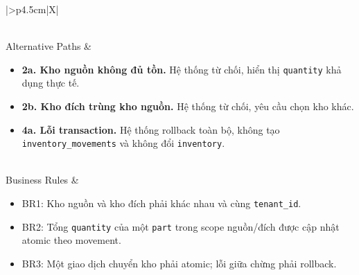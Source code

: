 \begin{xltabular}{\textwidth}{|>{\bfseries}p{4.5cm}|X|}
\begin{enumerate}[leftmargin=*, nosep]
    \end{enumerate} \\
    \hline
    Alternative Paths &
    \begin{itemize}[leftmargin=*, nosep]
        \item \textbf{2a. Kho nguồn không đủ tồn.} Hệ thống từ chối, hiển thị \texttt{quantity} khả dụng thực tế.
        \item \textbf{2b. Kho đích trùng kho nguồn.} Hệ thống từ chối, yêu cầu chọn kho khác.
        \item \textbf{4a. Lỗi transaction.} Hệ thống rollback toàn bộ, không tạo \texttt{inventory\_movements} và không đổi \texttt{inventory}.
    \end{itemize} \\
    \hline
    Business Rules &
    \begin{itemize}[leftmargin=*, nosep]
        \item BR1: Kho nguồn và kho đích phải khác nhau và cùng \texttt{tenant\_id}.
        \item BR2: Tổng \texttt{quantity} của một \texttt{part} trong scope nguồn/đích được cập nhật atomic theo movement.
        \item BR3: Một giao dịch chuyển kho phải atomic; lỗi giữa chừng phải rollback.
    \end{itemize} \\
    \hline
    \caption{Đặc tả Use Case: Chuyển kho thiết bị} \\
\end{xltabular}

